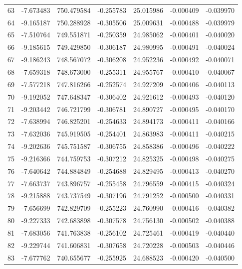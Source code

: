 \begin{tabular}{rrrrrrr}
  63 &  -7.673483 &  750.479584 & -0.255783 &  25.015986 &  -0.000409 & -0.039970 \\
  64 &  -9.165187 &  750.288928 & -0.305506 &  25.009631 &  -0.000488 & -0.039979 \\
  65 &  -7.510764 &  749.551871 & -0.250359 &  24.985062 &  -0.000401 & -0.040020 \\
  66 &  -9.185615 &  749.429850 & -0.306187 &  24.980995 &  -0.000491 & -0.040024 \\
  67 &  -9.186243 &  748.567072 & -0.306208 &  24.952236 &  -0.000492 & -0.040071 \\
  68 &  -7.659318 &  748.673000 & -0.255311 &  24.955767 &  -0.000410 & -0.040067 \\
  69 &  -7.577218 &  747.816266 & -0.252574 &  24.927209 &  -0.000406 & -0.040113 \\
  70 &  -9.192052 &  747.648347 & -0.306402 &  24.921612 &  -0.000493 & -0.040120 \\
  71 &  -9.203442 &  746.721799 & -0.306781 &  24.890727 &  -0.000495 & -0.040170 \\
  72 &  -7.638994 &  746.825201 & -0.254633 &  24.894173 &  -0.000411 & -0.040166 \\
  73 &  -7.632036 &  745.919505 & -0.254401 &  24.863983 &  -0.000411 & -0.040215 \\
  74 &  -9.202636 &  745.751587 & -0.306755 &  24.858386 &  -0.000496 & -0.040222 \\
  75 &  -9.216366 &  744.759753 & -0.307212 &  24.825325 &  -0.000498 & -0.040275 \\
  76 &  -7.640642 &  744.884849 & -0.254688 &  24.829495 &  -0.000413 & -0.040270 \\
  77 &  -7.663737 &  743.896757 & -0.255458 &  24.796559 &  -0.000415 & -0.040324 \\
  78 &  -9.215888 &  743.737549 & -0.307196 &  24.791252 &  -0.000500 & -0.040331 \\
  79 &  -7.656699 &  742.829709 & -0.255223 &  24.760990 &  -0.000416 & -0.040382 \\
  80 &  -9.227333 &  742.683898 & -0.307578 &  24.756130 &  -0.000502 & -0.040388 \\
  81 &  -7.683056 &  741.763838 & -0.256102 &  24.725461 &  -0.000419 & -0.040440 \\
  82 &  -9.229744 &  741.606831 & -0.307658 &  24.720228 &  -0.000503 & -0.040446 \\
  83 &  -7.677762 &  740.655677 & -0.255925 &  24.688523 &  -0.000420 & -0.040500 \\

\end{tabular}
